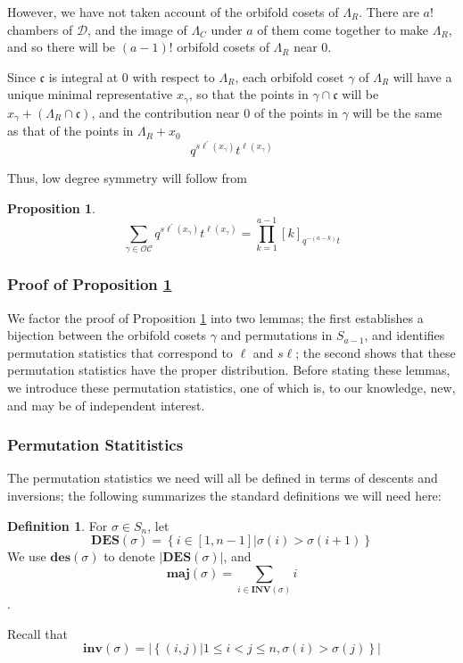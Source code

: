 \documentclass{amsart}[12pt]
\theoremstyle{definition}
\newtheorem{definition}[dummy]{Definition}
\newtheorem{proposition}[dummy]{Proposition}
\newcommand{\OC}{\mathcal{OC}}
\newcommand{\sk}{s\ell}
\newcommand{\inv}{\mathbf{inv}}
\newcommand{\INV}{\mathbf{INV}}
\newcommand{\DES}{\mathbf{DES}}
\newcommand{\des}{\mathbf{des}}
\newcommand{\maj}{\mathbf{maj}}
\newcommand{\cone}{\mathfrak{c}}
\newcommand{\dominant}{\mathcal{D}}
\begin{document}
However, we have not taken account of the orbifold cosets of $\Lambda_R$.  There are $a!$ chambers of $\dominant$, and the image of $\Lambda_C$ under $a$ of them come together to make $\Lambda_R$, and so there will be $(a-1)!$ orbifold cosets of $\Lambda_R$ near $0$.  

Since $\cone$ is integral at $0$ with respect to $\Lambda_R$, each orbifold coset $\gamma$ of $\Lambda_R$ will have a unique minimal representative $x_\gamma$, so that the points in $\gamma\cap\cone$ will be $x_\gamma+\left(\Lambda_R\cap \cone\right)$,  and the contribution near $0$ of the points in $\gamma$ will be the same as that of the points in $\Lambda_R+x_0$
$$q^{\sk^\prime(x_\gamma)}t^{\ell(x_\gamma)}$$

Thus, low degree symmetry will follow from
\begin{proposition} \label{prop:orbcosets}
$$\sum_{\gamma\in\OC} q^{\sk^\prime(x_\gamma)}t^{\ell(x_\gamma)}=\prod_{k=1}^{a-1}[k]_{q^{-(a-k)}t}$$ 

\end{proposition}
  
\subsubsection{Proof of Proposition \ref{prop:orbcosets}}

We factor the proof of Proposition \ref{prop:orbcosets} into two lemmas; the first establishes a bijection between the orbifold cosets $\gamma$ and permutations in $S_{a-1}$, and identifies permutation statistics that correspond to $\ell$ and $\sk$; the second shows that these permutation statistics have the proper distribution.  Before stating these lemmas, we introduce these permutation statistics, one of which is, to our knowledge, new, and may be of independent interest.

\subsubsection{Permutation Statitistics}
The permutation statistics we need will all be defined in terms of descents and inversions; the following summarizes the standard definitions we will need here:
\begin{definition} \label{def:standardpermutations}
For $\sigma\in S_n$, let 
$$\DES(\sigma)=\left\{i\in [1, n-1] \Big | \sigma(i)>\sigma(i+1)\right\}$$
We use $\des(\sigma)$ to denote $|\DES(\sigma)|$, and 
$$\maj(\sigma)=\sum_{i\in\INV(\sigma)} i$$.

Recall that 
$$\inv(\sigma)=\left|\left\{(i,j)\big| 1\leq i<j\leq n, \sigma(i)>\sigma(j)\right\}\right|$$
\end{definition}
\end{document}
